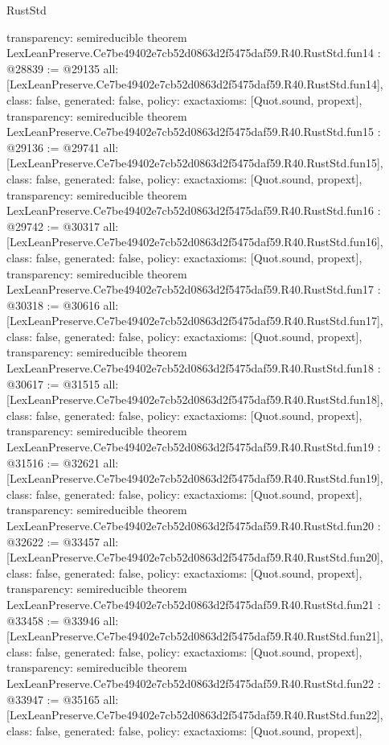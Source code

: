 \begin{lexlean}{RustStd}
\begin{coremodule}
{  transparency: semireducible
}
theorem LexLeanPreserve.Ce7be49402e7cb52d0863d2f5475daf59.R40.RustStd.fun14 : @28839 := @29135 {
  all: [LexLeanPreserve.Ce7be49402e7cb52d0863d2f5475daf59.R40.RustStd.fun14],
  class: false,
  generated: false,
  policy: exact{axioms: [Quot.sound, propext]},
  transparency: semireducible
}
theorem LexLeanPreserve.Ce7be49402e7cb52d0863d2f5475daf59.R40.RustStd.fun15 : @29136 := @29741 {
  all: [LexLeanPreserve.Ce7be49402e7cb52d0863d2f5475daf59.R40.RustStd.fun15],
  class: false,
  generated: false,
  policy: exact{axioms: [Quot.sound, propext]},
  transparency: semireducible
}
theorem LexLeanPreserve.Ce7be49402e7cb52d0863d2f5475daf59.R40.RustStd.fun16 : @29742 := @30317 {
  all: [LexLeanPreserve.Ce7be49402e7cb52d0863d2f5475daf59.R40.RustStd.fun16],
  class: false,
  generated: false,
  policy: exact{axioms: [Quot.sound, propext]},
  transparency: semireducible
}
theorem LexLeanPreserve.Ce7be49402e7cb52d0863d2f5475daf59.R40.RustStd.fun17 : @30318 := @30616 {
  all: [LexLeanPreserve.Ce7be49402e7cb52d0863d2f5475daf59.R40.RustStd.fun17],
  class: false,
  generated: false,
  policy: exact{axioms: [Quot.sound, propext]},
  transparency: semireducible
}
theorem LexLeanPreserve.Ce7be49402e7cb52d0863d2f5475daf59.R40.RustStd.fun18 : @30617 := @31515 {
  all: [LexLeanPreserve.Ce7be49402e7cb52d0863d2f5475daf59.R40.RustStd.fun18],
  class: false,
  generated: false,
  policy: exact{axioms: [Quot.sound, propext]},
  transparency: semireducible
}
theorem LexLeanPreserve.Ce7be49402e7cb52d0863d2f5475daf59.R40.RustStd.fun19 : @31516 := @32621 {
  all: [LexLeanPreserve.Ce7be49402e7cb52d0863d2f5475daf59.R40.RustStd.fun19],
  class: false,
  generated: false,
  policy: exact{axioms: [Quot.sound, propext]},
  transparency: semireducible
}
theorem LexLeanPreserve.Ce7be49402e7cb52d0863d2f5475daf59.R40.RustStd.fun20 : @32622 := @33457 {
  all: [LexLeanPreserve.Ce7be49402e7cb52d0863d2f5475daf59.R40.RustStd.fun20],
  class: false,
  generated: false,
  policy: exact{axioms: [Quot.sound, propext]},
  transparency: semireducible
}
theorem LexLeanPreserve.Ce7be49402e7cb52d0863d2f5475daf59.R40.RustStd.fun21 : @33458 := @33946 {
  all: [LexLeanPreserve.Ce7be49402e7cb52d0863d2f5475daf59.R40.RustStd.fun21],
  class: false,
  generated: false,
  policy: exact{axioms: [Quot.sound, propext]},
  transparency: semireducible
}
theorem LexLeanPreserve.Ce7be49402e7cb52d0863d2f5475daf59.R40.RustStd.fun22 : @33947 := @35165 {
  all: [LexLeanPreserve.Ce7be49402e7cb52d0863d2f5475daf59.R40.RustStd.fun22],
  class: false,
  generated: false,
  policy: exact{axioms: [Quot.sound, propext]},
}
\end{coremodule}
\end{lexlean}
